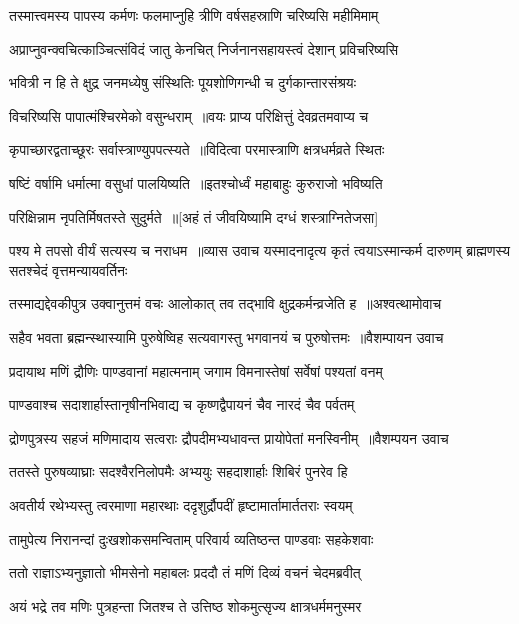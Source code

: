 \twolineshloka
{तस्मात्त्वमस्य पापस्य कर्मणः फलमाप्नुहि}
{त्रीणि वर्षसहस्राणि चरिष्यसि महीमिमाम्}


\twolineshloka
{अप्राप्नुवन्क्वचित्काञ्चित्संविदं जातु केनचित्}
{निर्जनानसहायस्त्वं देशान् प्रविचरिष्यसि}


\threelineshloka
{भवित्री न हि ते क्षुद्र जनमध्येषु संस्थितिः}
{पूयशोणिगन्धी च दुर्गकान्तारसंश्रयः}
{}


\twolineshloka
{विचरिष्यसि पापात्मंश्चिरमेको वसुन्धराम् ॥वयः प्राप्य परिक्षित्तुं देवव्रतमवाप्य च}
{}


\twolineshloka
{कृपाच्छारद्वताच्छूरः सर्वास्त्राण्युपपत्स्यते ॥विदित्वा परमास्त्राणि क्षत्रधर्मव्रते स्थितः}
{}


\twolineshloka
{षष्टिं वर्षामि धर्मात्मा वसुधां पालयिष्यति ॥इतश्चोर्ध्वं महाबाहुः कुरुराजो भविष्यति}
{}


\twolineshloka
{परिक्षिन्नाम नृपतिर्मिषतस्ते सुदुर्मते ॥[अहं तं जीवयिष्यामि दग्धं शस्त्राग्नितेजसा]}
{}


\threelineshloka
{पश्य मे तपसो वीर्यं सत्यस्य च नराधम ॥व्यास उवाच}
{यस्मादनादृत्य कृतं त्वयाऽस्मान्कर्म दारुणम्}
{ब्राह्मणस्य सतश्चेदं वृत्तमन्यायवर्तिनः}


\threelineshloka
{तस्माद्यद्देवकीपुत्र उक्वानुत्तमं वचः}
{आलोकात् तव तद्भावि क्षुद्रकर्मन्व्रजेति ह ॥अश्वत्थामोवाच}
{}


\threelineshloka
{सहैव भवता ब्रह्मन्स्थास्यामि पुरुषेष्विह}
{सत्यवागस्तु भगवानयं च पुरुषोत्तमः ॥वैशम्पायन उवाच}
{}


\twolineshloka
{प्रदायाथ मणिं द्रौणिः पाण्डवानां महात्मनाम्}
{जगाम विमनास्तेषां सर्वेषां पश्यतां वनम्}


\twolineshloka
{पाण्डवाश्च सदाशार्हास्तानृषीनभिवाद्य च}
{कृष्णद्वैपायनं चैव नारदं चैव पर्वतम्}


\threelineshloka
{द्रोणपुत्रस्य सहजं मणिमादाय सत्वराः}
{द्रौपदीमभ्यधावन्त प्रायोपेतां मनस्विनीम् ॥वैशम्पयन उवाच}
{}


\twolineshloka
{ततस्ते पुरुषव्याघ्राः सदश्वैरनिलोपमैः}
{अभ्ययुः सहदाशार्हाः शिबिरं पुनरेव हि}


\twolineshloka
{अवतीर्य रथेभ्यस्तु त्वरमाणा महारथाः}
{ददृशुर्द्रौपदीं हृष्टामार्तामार्ततराः स्वयम्}


\twolineshloka
{तामुपेत्य निरानन्दां दुःखशोकसमन्विताम्}
{परिवार्य व्यतिष्ठन्त पाण्डवाः सहकेशवाः}


\twolineshloka
{ततो राज्ञाऽभ्यनुज्ञातो भीमसेनो महाबलः}
{प्रददौ तं मणिं दिव्यं वचनं चेदमब्रवीत्}


\twolineshloka
{अयं भद्रे तव मणिः पुत्रहन्ता जितश्च ते}
{उत्तिष्ठ शोकमुत्सृज्य क्षात्रधर्ममनुस्मर}


